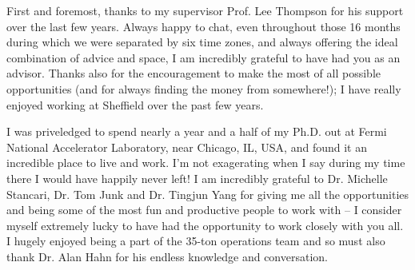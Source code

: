 
\begin{acknowledgements}








First and foremost, thanks to my supervisor Prof. Lee Thompson for his support over the last few years.  Always happy to chat, even throughout those 16 months during which we were separated by six time zones, and always offering the ideal combination of advice and space, I am incredibly grateful to have had you as an advisor.  Thanks also for the encouragement to make the most of all possible opportunities (and for always finding the money from somewhere!); I have really enjoyed working at Sheffield over the past few years.

I was priveledged to spend nearly a year and a half of my Ph.D. out at Fermi National Accelerator Laboratory, near Chicago, IL, USA, and found it an incredible place to live and work.  I'm not exagerating when I say during my time there I would have happily never left!  I am incredibly grateful to Dr. Michelle Stancari, Dr. Tom Junk and Dr. Tingjun Yang for giving me all the opportunities and being some of the most fun and productive people to work with -- I consider myself extremely lucky to have had the opportunity to work closely with you all.  I hugely enjoyed being a part of the 35-ton operations team and so must also thank Dr. Alan Hahn for his endless knowledge and conversation.


\end{acknowledgements}
